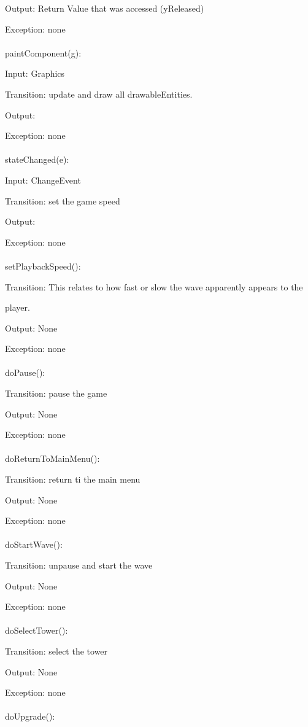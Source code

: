 \documentclass[12,english]{article}
\begin{document}
		Output: Return Value that was accessed (yReleased)
		
		Exception: none\\
		\\
		paintComponent(g):
		
		Input: Graphics
		
		Transition: update and draw all drawableEntities.
		
		Output:
		
		Exception: none\\
		\\stateChanged(e):
		
		Input: ChangeEvent
		
		Transition: set the game speed 
		
		Output:
		
		Exception: none\\
		\\
		setPlaybackSpeed():
		
		Transition: This relates to how fast or slow the wave apparently appears to the
		
		player.
		
		Output: None
		
		Exception: none\\
		\\
		doPause():
		
		Transition: pause the game
		
		Output: None
		
		Exception: none\\
		\\
		doReturnToMainMenu():
		
		Transition: return ti the main menu
		
		Output: None
		
		Exception: none\\
		\\
		doStartWave():
		
		Transition: unpause and start the wave
		
		Output: None
		
		Exception: none\\
		\\
		doSelectTower():
		
		Transition: select the tower
		
		Output: None
		
		Exception: none\\
		\\
		doUpgrade():
		
\end{document}
